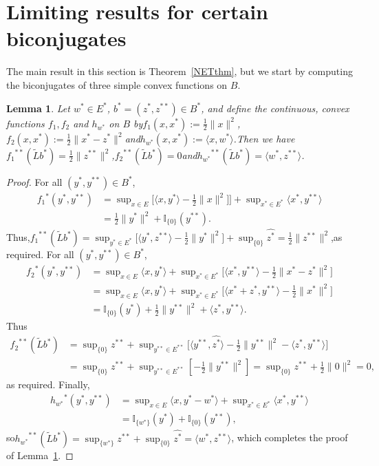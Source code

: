 \documentclass[letterpaper]{article}
\theoremstyle{plain}
\newtheorem{lemma}[theorem]{Lemma}
\theoremstyle{definition}
\numberwithin{equation}{section}
\newcommand{\bra}[2]{\langle#1,#2\rangle}
\newcommand{\Bra}[2]{\big\langle#1,#2\big\rangle}
\newcommand{\dbs}{^{**}}
\newcommand{\half}{{\textstyle\frac{1}{2}}}
\newcommand{\I}{\mathbb I}
\newcommand{\Lt}{{\wt L}}
\newcommand{\supn}{\sup\nolimits}
\newcommand{\wh}{\widehat}
\newcommand{\wt}{\widetilde}
\newcommand{\Lem}{Lemma~\ref}
\newcommand{\Thm}{Theorem~\ref}
\begin{document}
\section{Limiting results for certain biconjugates}\label{NETsec}
The main result in this section is \Thm{NETthm}, but we start by computing the biconjugates of three simple convex functions on $B$.
\begin{lemma}\label{CONJlem}
Let $w^* \in E^*$, $b^* = (z^*,z\dbs) \in B^*$, and define the continuous, convex functions $f_1,f_2$ and $h_{w^*}$ on $B$ by\quad $f_1(x,x^*) := \half\|x\|^2$,\quad $f_2(x,x^*) := \half\|x^* - z^*\|^2$\quad and\quad $h_{w^*}(x,x^*) := \bra{x}{w^*}$.\quad     Then we have\quad ${f_1}\dbs(\Lt b^*) = \half\|z\dbs\|^2$,\quad ${f_2}\dbs(\Lt b^*) = 0$\quad and\quad ${h_{w^*}}\dbs(\Lt b^*) = \bra{w^*}{z\dbs}$.
\end{lemma}
\begin{proof}
For all $(y^*,y\dbs) \in B^*$,
%
\begin{align*}
{f_1}^*(y^*,y\dbs)
&= \supn_{x \in E}\big[\bra{x}{y^*} - \half\|x\|^2]\big] + \supn_{x^* \in E^*}\bra{x^*}{y\dbs}\\
&=  \half\|y^*\|^2 + \I_{\{0\}}(y\dbs).
\end{align*}
Thus,\quad ${f_1}\dbs(\Lt b^*) =\supn_{y^* \in E^*}\big[\Bra{y^*}{z\dbs} - \half\|y^*\|^2\big] +  \supn_{\{0\}}{\wh{z^*}} = \half\|z\dbs\|^2$,\quad as required.   For all $(y^*,y\dbs) \in B^*$,
\begin{align*}
{f_2}^*(y^*,y\dbs)
&= \supn_{x \in E}\bra{x}{y^*} +  \supn_{x^* \in E^*}\big[\bra{x^*}{y\dbs} - \half\|x^* - z^*\|^2\big]\\
&= \supn_{x \in E}\bra{x}{y^*} +  \supn_{x^* \in E^*}\big[\bra{x^* + z^*}{y\dbs} - \half\|x^*\|^2\big]\\
&=  \I_{\{0\}}(y^*) + \half\|y\dbs\|^2 + \bra{z^*}{y\dbs}.
\end{align*}
%
Thus
%
\begin{align*}
{f_2}\dbs(\Lt b^*) &= \supn_{\{0\}}{z\dbs} + \supn_{y\dbs \in E\dbs}\big[\Bra{y\dbs}{\wh{z^*}} - \half\|y\dbs\|^2 - \bra{z^*}{y\dbs}\big]\\
&= \supn_{\{0\}}{z\dbs} + \supn_{y\dbs \in E\dbs}[ - \half\|y\dbs\|^2] = \supn_{\{0\}}{z\dbs} + \half\|0\|^2 = 0,
\end{align*}
%
as required.   Finally,
%
\begin{align*}
{h_{w^*}}^*(y^*,y\dbs) &= \supn_{x \in E}\bra{x}{y^* - w^*} + \supn_{x^* \in E^*}\bra{x^*}{y\dbs}\\
&= \I_{\{w^*\}}(y^*) + \I_{\{0\}}(y\dbs),
\end{align*}
%
so\quad ${h_{w^*}}\dbs(\Lt b^*) = \supn_{\{w^*\}}{z\dbs} + \supn_{\{0\}}\wh{z^*}  = \bra{w^*}{z\dbs}$,\quad
%
which completes the proof of \Lem{CONJlem}.
\end{proof}
\end{document}

